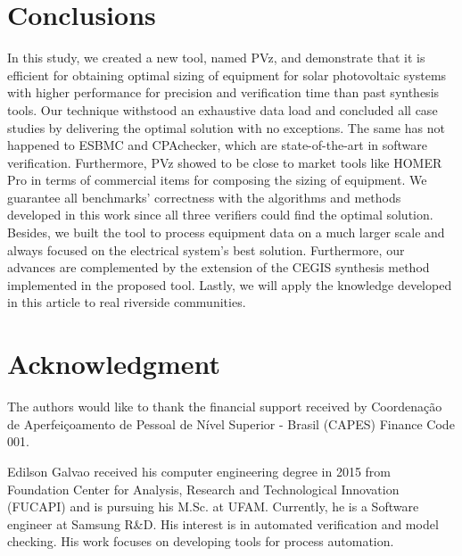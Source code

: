\documentclass[journal]{IEEEtran}
\begin{document}
\section{Conclusions} 
In this study, we created a new tool, named PVz, and demonstrate that it is efficient for obtaining optimal sizing of equipment for solar photovoltaic systems with higher performance for precision and verification time than past synthesis tools. Our technique withstood an exhaustive data load and concluded all case studies by delivering the optimal solution with no exceptions. The same has not happened to ESBMC and CPAchecker, which are state-of-the-art in software verification. Furthermore, PVz showed to be close to market tools like HOMER Pro in terms of commercial items for composing the sizing of equipment. 
We guarantee all benchmarks' correctness with the algorithms and methods developed in this work since all three verifiers could find the optimal solution. Besides, we built the tool to process equipment data on a much larger scale and always focused on the electrical system's best solution. Furthermore, our advances are complemented by the extension of the CEGIS synthesis method implemented in the proposed tool. Lastly, we will apply the knowledge developed in this article to real riverside communities.



\section*{Acknowledgment}
The authors would like to thank the financial support received by Coordenação de Aperfeiçoamento de Pessoal de Nível Superior - Brasil (CAPES) Finance Code 001.

\ifCLASSOPTIONcaptionsoff
  \newpage
\fi


%


\begin{IEEEbiography}
    {Edilson Galvao} received his computer engineering degree in 2015 from Foundation Center for Analysis, Research and Technological Innovation (FUCAPI) and is pursuing his M.Sc. at UFAM. Currently, he is a Software engineer at Samsung R\&D. His interest is in automated verification and model checking. His work focuses on developing tools for process automation.
\end{IEEEbiography}
\end{document}
